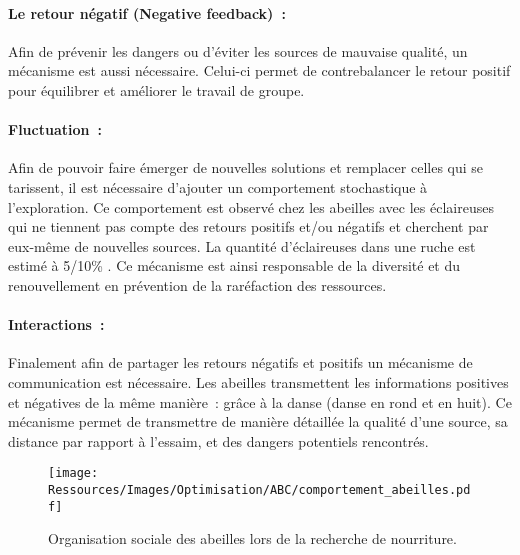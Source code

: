 \paragraph{Le retour négatif (Negative feedback)~:} %
\label{par:negative_feedback}
Afin de prévenir les dangers ou d’éviter les sources de mauvaise qualité, un
mécanisme est aussi nécessaire. Celui-ci permet de contrebalancer le retour
positif pour équilibrer et améliorer le travail de groupe.

\paragraph{Fluctuation~:} %
\label{par:fluctuation}
Afin de pouvoir faire émerger de nouvelles solutions et remplacer celles qui se tarissent,
il est nécessaire d’ajouter un comportement stochastique à l’exploration. Ce comportement
est observé chez les abeilles avec les éclaireuses qui ne tiennent pas compte des retours
positifs et/ou négatifs et cherchent par eux-même de nouvelles sources. La quantité
d’éclaireuses dans une ruche est estimé à 5/10\si{\percent} \parencite{Seeley1996}. Ce
mécanisme est ainsi responsable de la diversité et du renouvellement en prévention de la
raréfaction des ressources.

\paragraph{Interactions~:} %
\label{par:intractions}
Finalement afin de partager les retours négatifs et positifs un mécanisme de
communication est nécessaire.
Les abeilles transmettent les informations positives et négatives de la même
manière~: grâce à la danse (danse en rond et en huit).
Ce mécanisme permet de transmettre de manière détaillée la qualité d’une source, sa
distance par rapport à l’essaim, et des dangers potentiels rencontrés.

\begin{figure}
    \centering
    \texttt{[image: Ressources/Images/Optimisation/ABC/comportement\_abeilles.pdf]}
    \caption[Organisation sociale des abeilles lors de la recherche de nourriture]
            {Organisation sociale des abeilles lors de la recherche de nourriture.}
    \label{fig:bee_dance}
\end{figure}


